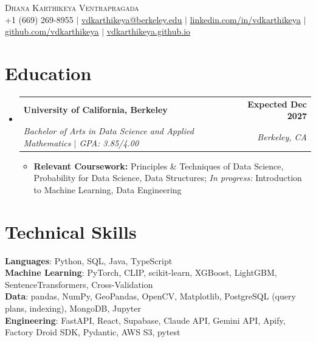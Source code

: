 \documentclass[letterpaper,11pt]{article}
\makeatletter
\newcommand{\resumeItem}[1]{
  \item\small{
    {#1 \vspace{-2pt}}
  }
}
\newcommand{\resumeSubheading}[4]{
  \vspace{-2pt}\item
    \begin{tabular*}{1.0\textwidth}[t]{l@{\extracolsep{\fill}}r}
      \textbf{#1} & \textbf{\small #2} \\
      \textit{\small#3} & \textit{\small #4} \\
    \end{tabular*}\vspace{-7pt}
}
\newcommand{\resumeSubHeadingListStart}{\begin{itemize}[leftmargin=0.0in, label={}]}
\newcommand{\resumeSubHeadingListEnd}{\end{itemize}}
\newcommand{\resumeItemListStart}{\begin{itemize}[itemsep=2.5pt, topsep=3pt]}
\newcommand{\resumeItemListEnd}{\end{itemize}\vspace{-4pt}}
\makeatother
\begin{document}
\begin{center}
    {\Huge \scshape Dhana Karthikeya Ventrapragada} \\ \vspace{1pt}
        \footnotesize
    +1 (669) 269-8955 $|$
    \href{mailto:vdkarthikeya@berkeley.edu}{\uline{vdkarthikeya@berkeley.edu}} $|$
    \href{https://www.linkedin.com/in/vdkarthikeya/}{\uline{linkedin.com/in/vdkarthikeya}} $|$
    \href{https://github.com/vdkarthikeya}{\uline{github.com/vdkarthikeya}} $|$
    \href{https://vdkarthikeya.github.io}{\uline{vdkarthikeya.github.io}}
    \vspace{-8pt}
\end{center}

\section{Education}
\resumeSubHeadingListStart

\resumeSubheading
{University of California, Berkeley}{Expected Dec 2027}
{Bachelor of Arts in Data Science and Applied Mathematics \;$|$\; GPA: 3.85/4.00}{Berkeley, CA}

\vspace{-6pt}
\resumeItemListStart
\resumeItem{\textbf{Relevant Coursework:} Principles \& Techniques of Data Science, Probability for Data Science, Data Structures; \textit{In progress:} Introduction to Machine Learning, Data Engineering}
\resumeItemListEnd

\resumeSubHeadingListEnd
\vspace{-14pt}

\section{Technical Skills}
 \begin{itemize}[leftmargin=0.15in, label={}, itemsep=3pt]
    \small{\item{
     \textbf{Languages}{: Python, SQL, Java, TypeScript} \\[2pt]
     \textbf{Machine Learning}{: PyTorch, CLIP, scikit-learn, XGBoost, LightGBM, SentenceTransformers, Cross-Validation} \\[2pt]
     \textbf{Data}{: pandas, NumPy, GeoPandas, OpenCV, Matplotlib, PostgreSQL (query plans, indexing), MongoDB, Jupyter} \\[2pt]
     \textbf{Engineering}{: FastAPI, React, Supabase, Claude API, Gemini API, Apify, Factory Droid SDK, Pydantic, AWS S3, pytest}
    }}
 \end{itemize}
 \vspace{-15pt}
\end{document}
